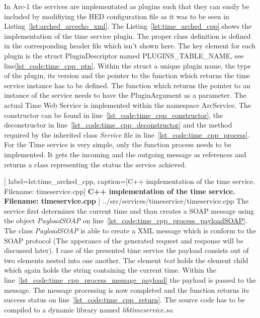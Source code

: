 In Arc-1 the services are implementated as plugins such that they can easily be included by modifiying the HED configuration file as it was to be seen in Listing~\ref{lst:arched_arcecho_xml}.
The Listing~\ref{lst:time_arched_cpp}.shows the implementation of the time service plugin.
The proper class definition is defined in the corresponding header file which isn't shown here.
The key element for each plugin is the struct PluginDescriptor named PLUGINS\_TABLE\_NAME, see line\ref{lst_code:time_cpp_ptn}. 
Within the struct a unique plugin name, the type of the plugin, its version and the pointer to the function which returns the time service instance has to be defined.
The function which returns the pointer to an instance of the service needs to have the PluginArgument as a parameter. 
The actual Time Web Service is implemented within the namespace ArcService. The constructor can be found in line~\ref{lst_code:time_cpp_constructor}, the deconstructor in line~\ref{lst_code:time_cpp_deconstructor} and the method required by the inherited class \textit{Service} file in line~\ref{lst_code:time_cpp_process}. For the Time service is very simple, only the function process needs to be implemented. It gets the incoming and the outgoing message as references and returns a class representing the status the service achieved. 

	[
	label=lst:time_arched_cpp,
	caption={[C++ implementation of the time service. Filename: timeservice.cpp]
	\textbf{C++ implementation of the time service. Filename: timeservice.cpp}}
	]
{../src/services/timeservice/timeservice.cpp}
The service first determines the current time and than creates a SOAP message using the object \textit{PayloadSOAP} on line~\ref{lst_code:time_cpp_process_payloadSOAP}. The class \textit{PayloadSOAP} is able to create a XML message which is conform to the SOAP protocol (The apperance of the generated request and response will be discussed later). I case of the presented time service the payload consists out of two elements nested into one another. The element \textit{text} holds the element child which again holds the string containing the current time.
Within the line~\ref{lst_code:time_cpp_process_message_payload} the payload is passed to the message. 
The message processing is now completed and the function returns its success status on line~\ref{lst_code:time_cpp_return}.
The source code has to be compiled to a dynamic library named \textit{libtimeservice.so}.\\


